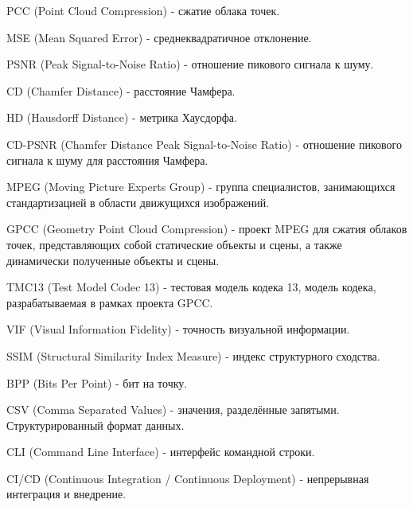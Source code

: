 \noindent PCC (Point Cloud Compression) - сжатие облака точек.

\noindent MSE (Mean Squared Error) - среднеквадратичное отклонение.

\noindent PSNR (Peak Signal-to-Noise Ratio) - отношение пикового сигнала к
шуму.

\noindent CD (Chamfer Distance) - расстояние Чамфера.

\noindent HD (Hausdorff Distance) - метрика Хаусдорфа.

\noindent CD-PSNR (Chamfer Distance Peak Signal-to-Noise Ratio) - отношение
пикового сигнала к шуму для расстояния Чамфера.

\noindent MPEG (Moving Picture Experts Group) - группа специалистов,
занимающихся стандартизацией в области движущихся изображений.

\noindent GPCC (Geometry Point Cloud Compression) - проект MPEG для сжатия
облаков точек, представляющих собой статические объекты и сцены, а также
динамически полученные объекты и сцены.

\noindent TMC13 (Test Model Codec 13) - тестовая модель кодека 13, модель
кодека, разрабатываемая в рамках проекта GPCC.

\noindent VIF (Visual Information Fidelity) - точность визуальной информации.

\noindent SSIM (Structural Similarity Index Measure) - индекс структурного
сходства.

\noindent BPP (Bits Per Point) - бит на точку.

\noindent CSV (Comma Separated Values) - значения, разделённые запятыми.
Структурированный формат данных.

\noindent CLI (Command Line Interface) - интерфейс командной строки.

\noindent CI/CD (Continuous Integration / Continuous Deployment) - непрерывная
интеграция и внедрение.
